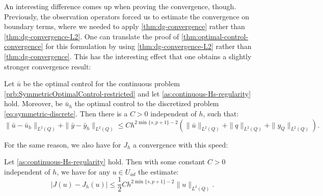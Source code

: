 \documentclass[../thesis.tex]{subfiles}
\begin{document}
An interesting difference comes up when proving the convergence, though. Previously, the observation operators forced us to estimate the convergence on boundary terms, where we needed to apply \cref{thm:dg-convergence} rather than \cref{thm:dg-convergence-L2}. One can translate the proof of \cref{thm:optimal-control-convergence} for this formulation by using \cref{thm:dg-convergence-L2} rather than \cref{thm:dg-convergence}.
This has the interesting effect that one obtains a slightly stronger convergence result:
\begin{theorem}
\label{thm:optimal-control-convergence-symm}
Let $\bar{u}$ be the optimal control for the continuous problem \cref{prb:SymmetricOptimalControl-restricted} and let \cref{as:continuous-Hs-regularity} hold. Moreover, be $\bar{u}_h$ the optimal control to the discretized problem \cref{eq:symmetric-discrete}.
Then there is a $C > 0$ independent of $h$, such that:
\[
	\| \bar{u} - \bar{u}_h \|_{L^2(Q)} + \| \bar{y} - \bar{y}_h \|_{L^2(Q)} \leq C h^{2 \min \{ s, p+1\} - 2} \left( \| \bar{u} \|_{L^2(Q)} + \| q \|_{L^2(Q)} + \| y_Q \|_{L^2(Q)} \right).
\]
\end{theorem}
For the same reason, we also have for $J_h$ a convergence with this speed:
\begin{lemma}
\label{thm:J-convergence-symm}
Let \cref{as:continuous-Hs-regularity} hold. Then with some constant $C > 0$ independent of $h$, we have for any $u \in U_{ad}$ the estimate:
\[
	| J(u) - J_h(u) | \leq \frac{1}{2} C h^{2\min \{ s, p+1\} -2} \| u \|_{L^2(Q)}.
\]
\end{lemma}
\end{document}
